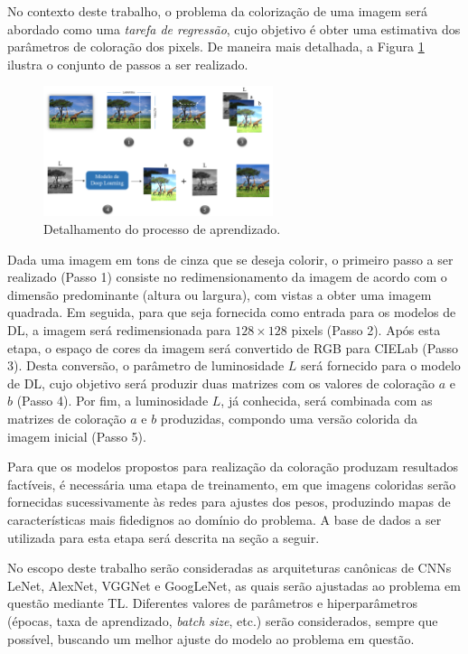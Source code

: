 No contexto deste trabalho, o problema da colorização de uma imagem será abordado como uma \emph{tarefa de regressão}, cujo objetivo é obter uma estimativa dos parâmetros de coloração dos pixels. De maneira mais detalhada, a Figura \ref{fig:aprendizado} ilustra o conjunto de passos a ser realizado.

\begin{figure}[h]
	\centering
	\includegraphics[width=0.6\textwidth]{./img/aprendizado}
	\caption{Detalhamento do processo de aprendizado.}
	\label{fig:aprendizado}
\end{figure}

Dada uma imagem em tons de cinza que se deseja colorir, o primeiro passo a ser realizado (Passo 1) consiste no redimensionamento da imagem de acordo com o dimensão predominante (altura ou largura), com vistas a obter uma imagem quadrada. Em seguida, para que seja fornecida como entrada para os modelos de DL, a imagem será redimensionada para $128 \times 128$ pixels (Passo 2). Após esta etapa, o espaço de cores da imagem será convertido de RGB para CIELab (Passo 3). Desta conversão, o parâmetro de luminosidade $L$ será fornecido para o modelo de DL, cujo objetivo será produzir duas matrizes com os valores de coloração $a$ e $b$ (Passo 4). Por fim, a luminosidade $L$, já conhecida, será combinada com as matrizes de coloração $a$ e $b$ produzidas, compondo uma versão colorida da imagem inicial (Passo 5).

Para que os modelos propostos para realização da coloração produzam resultados factíveis, é necessária uma etapa de treinamento, em que imagens coloridas serão fornecidas sucessivamente às redes para ajustes dos pesos, produzindo mapas de características mais fidedignos ao domínio do problema. A base de dados a ser utilizada para esta etapa será descrita na seção a seguir.

No escopo deste trabalho serão consideradas as arquiteturas canônicas de CNNs LeNet, AlexNet, VGGNet e GoogLeNet, as quais serão ajustadas ao problema em questão mediante TL. Diferentes valores de parâmetros e hiperparâmetros (épocas, taxa de aprendizado, \emph{batch size}, etc.) serão considerados, sempre que possível, buscando um melhor ajuste do modelo ao problema em questão.

